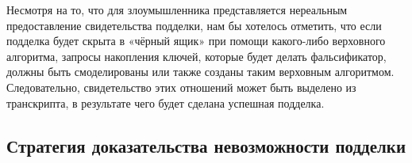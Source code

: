 \documentclass{mrl}
\theoremstyle{definition}
\numberwithin{theorem}{subsection}
\newtheorem{disc}[theorem]{Примечание}
\newcommand{\adversary}{\mathcal{A}}
\begin{document}
Несмотря на то, что для злоумышленника представляется нереальным предоставление свидетельства подделки, нам бы хотелось отметить, что если подделка будет скрыта в «чёрный ящик» при помощи какого-либо верховного алгоритма, запросы накопления ключей, которые будет делать фальсификатор, должны быть смоделированы или также созданы таким верховным алгоритмом. Следовательно, свидетельство этих отношений может быть выделено из транскрипта, в результате чего будет сделана успешная подделка.




\subsection{Стратегия доказательства невозможности подделки}\label{strat}
\end{document}
